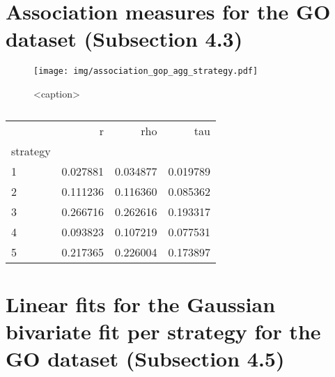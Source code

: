 \documentclass{article}
\begin{document}
\section{Association measures for the GO dataset (Subsection 4.3)}

\begin{figure}[htbp]
    \centering
    \texttt{[image: img/association\_gop\_agg\_strategy.pdf]}
    \caption{<caption>}
    \label{<label>}
\end{figure}
\begin{table}
    \centering
    \caption{}
    \begin{tabular}{lrrr}
        \toprule
                 & r        & rho      & tau      \\
        strategy &          &          &          \\
        \midrule
        1        & 0.027881 & 0.034877 & 0.019789 \\
        2        & 0.111236 & 0.116360 & 0.085362 \\
        3        & 0.266716 & 0.262616 & 0.193317 \\
        4        & 0.093823 & 0.107219 & 0.077531 \\
        5        & 0.217365 & 0.226004 & 0.173897 \\
        \bottomrule
    \end{tabular}
\end{table}


\section{Linear fits for the Gaussian bivariate fit per strategy for the GO dataset (Subsection 4.5)}
\end{document}
